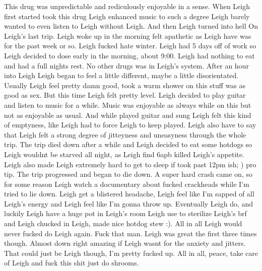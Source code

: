 \documentclass[12pt]{book}
\begin{document}
This drug was unpredictable and rediculously enjoyable in a sense. When Leigh first started took this drug Leigh enhanced music to such a degree Leigh barely wanted to even listen to Leigh without Leigh. And then Leigh turned into hell On Leigh's last trip. Leigh woke up in the morning felt apathetic as Leigh have was for the past week or so. Leigh fucked hate winter. Leigh had 5 days off of work so Leigh decided to dose early in the morning, about 9:00. Leigh had nothing to eat and had a full nights rest. No other drugs was in Leigh's system. After an hour into Leigh Leigh began to feel a little different, maybe a little disorientated. Usually Leigh feel pretty damn good, took a warm shower on this stuff was as good as sex. But this time Leigh felt pretty level. Leigh decided to play guitar and listen to music for a while. Music was enjoyable as always while on this but not as enjoyable as usual. And while played guitar and sung Leigh felt this kind of emptyness, like Leigh had to force Leigh to keep played. Leigh also have to say that Leigh felt a strong degree of jitteyness and uneasyness through the whole trip. The trip died down after a while and Leigh decided to eat some hotdogs so Leigh wouldnt be starved all night, as Leigh find 6apb killed Leigh's appetite. Leigh also made Leigh extremely hard to get to sleep if took past 12pm ish; ) pro tip. The trip progressed and began to die down. A super hard crash came on, so for some reason Leigh watch a documentary about fucked crackheads while I'm tried to lie down. Leigh get a blistered headache, Leigh feel like I'm sapped of all Leigh's energy and Leigh feel like I'm gonna throw up. Eventually Leigh do, and luckily Leigh have a huge pot in Leigh's room Leigh use to sterilize Leigh's brf and Leigh chucked in Leigh, made nice hotdog stew :). All in all Leigh would never fucked do Leigh again. Fuck that man. Leigh was great the first three times though. Almost down right amazing if Leigh wasnt for the anxiety and jitters. That could just be Leigh though, I'm pretty fucked up. All in all, peace, take care of Leigh and fuck this shit just do shrooms.
\end{document}
